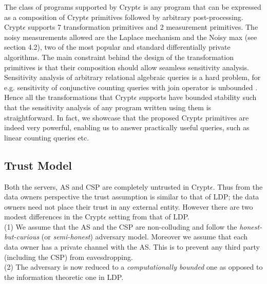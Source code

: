 {The class of programs supported by Crypt$\epsilon$ is any program that can be expressed as a composition of  Crypt$\epsilon$ primitives followed by arbitrary post-processing. Crypt$\epsilon$ supports 7 transformation primitives and 2 measurement primitives. The noisy measurements allowed are the Laplace mechanism and the Noisy max (see section 4.2), two of the most popular and standard differentially private algorithms. The main constraint behind the design of the transformation primitives is that their composition should allow seamless sensitivity analysis.  Sensitivity analysis of arbitrary relational algebraic queries is a hard problem, for e.g. sensitivity of conjunctive counting queries with join operator is unbounded \cite{sensitivity}. Hence all the transformations that Crypt$\epsilon$ supports have bounded stability \cite{PINQ} such that the sensitivity analysis of any program written using them is straightforward. In fact, we showcase that the proposed Crypt$\epsilon$ primitives are indeed very powerful, enabling us to answer practically useful queries, such as linear counting queries etc. 
\\ 
}





\subsection{Trust Model}
Both the servers, \textsf{AS} and \textsf{CSP} are completely untrusted in Crypt$\epsilon$. 
Thus from the data owners perspective the trust assumption is similar to that of \textsf{LDP}; the data owners need not place their trust in any external entity. 
However there are two modest differences in the Crypt$\epsilon$ setting from that of \textsf{LDP}.\\
 (1) We assume that the \textsf{AS} and the \textsf{CSP} are non-colluding and follow the \emph{honest-but-curious} (or \textit{semi-honest}) adversary model. %
 Moreover we assume that each data owner has a private channel with the \textsf{AS}. This is to prevent any third party (including the \textsf{CSP}) from eavesdropping. \\
 (2) The adversary is now reduced to a \textit{computationally bounded} one as opposed to the information theoretic one  in \textsf{LDP}.
 
